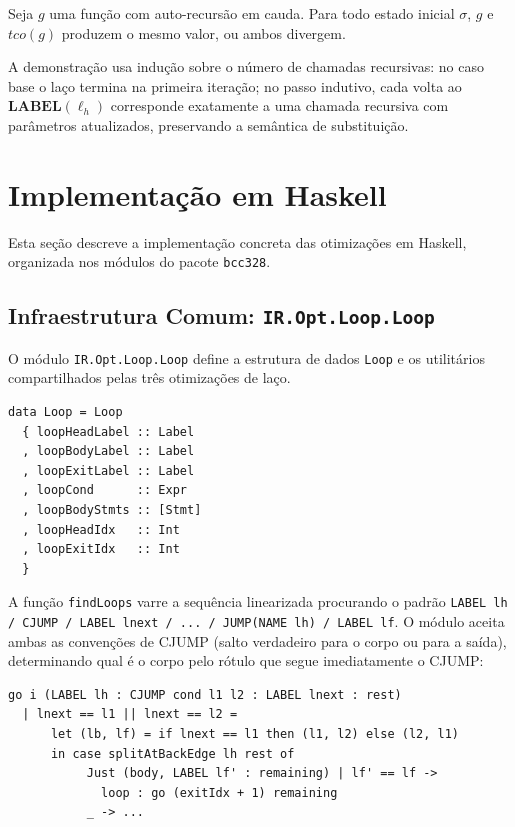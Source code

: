 \begin{Theorem}\label{thm:tco-correct}
  Seja $g$ uma função com auto-recursão em cauda.  Para todo estado inicial
  $\sigma$, $g$ e $\mathit{tco}(g)$ produzem o mesmo valor, ou ambos divergem.
\end{Theorem}

A demonstração usa indução sobre o número de chamadas recursivas: no caso base
o laço termina na primeira iteração; no passo indutivo, cada volta ao
$\mathbf{LABEL}(\ell_h)$ corresponde exatamente a uma chamada recursiva com
parâmetros atualizados, preservando a semântica de substituição.

\section{Implementação em Haskell}\label{sec:opt-impl}

Esta seção descreve a implementação concreta das otimizações em Haskell,
organizada nos módulos do pacote \texttt{bcc328}.

\subsection{Infraestrutura Comum:
\texttt{IR.Opt.Loop.Loop}}\label{sec:impl-loop}

O módulo \texttt{IR.Opt.Loop.Loop} define a estrutura de dados \texttt{Loop} e
os utilitários compartilhados pelas três otimizações de laço.

\begin{verbatim}
data Loop = Loop
  { loopHeadLabel :: Label
  , loopBodyLabel :: Label
  , loopExitLabel :: Label
  , loopCond      :: Expr
  , loopBodyStmts :: [Stmt]
  , loopHeadIdx   :: Int
  , loopExitIdx   :: Int
  }
\end{verbatim}

A função \texttt{findLoops} varre a sequência linearizada procurando o padrão
\texttt{LABEL lh / CJUMP / LABEL lnext / ... / JUMP(NAME lh) / LABEL lf}.
O módulo aceita ambas as convenções de CJUMP (salto verdadeiro para o corpo ou
para a saída), determinando qual é o corpo pelo rótulo que segue imediatamente
o CJUMP:

\begin{verbatim}
go i (LABEL lh : CJUMP cond l1 l2 : LABEL lnext : rest)
  | lnext == l1 || lnext == l2 =
      let (lb, lf) = if lnext == l1 then (l1, l2) else (l2, l1)
      in case splitAtBackEdge lh rest of
           Just (body, LABEL lf' : remaining) | lf' == lf ->
             loop : go (exitIdx + 1) remaining
           _ -> ...
\end{verbatim}

